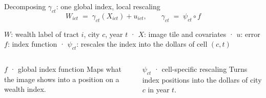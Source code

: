 \documentclass[10pt,aspectratio=169]{beamer}
\begin{document}
\begin{frame}{Decomposing $\gamma_{ct}$: one global index, local rescaling}
\[
  W_{ict} \;=\; \gamma_{ct}(X_{ict}) + u_{ict},
  \qquad
  \gamma_{ct} \;=\; \psi_{ct}\circ f
\]
{\footnotesize\centering
$W$: wealth label of tract $i$, city $c$, year $t$ \;·\; $X$: image tile and covariates \;·\; $u$: error\\[2pt]
$f$: index function \;·\; $\psi_{ct}$: rescales the index into the dollars of cell $(c,t)$\par}
\medskip
\begin{columns}[T]
\begin{tbox}[blue]{$f$ · global index function}
\footnotesize Maps what the image shows into a position on a wealth index.\\[1pt]
\end{tbox}
\begin{tbox}[blue]{$\psi_{ct}$ · cell-specific rescaling}
\footnotesize Turns index positions into the dollars of city $c$ in year $t$.\\[1pt]
\end{tbox}
\end{columns}
\end{frame}
\end{document}
